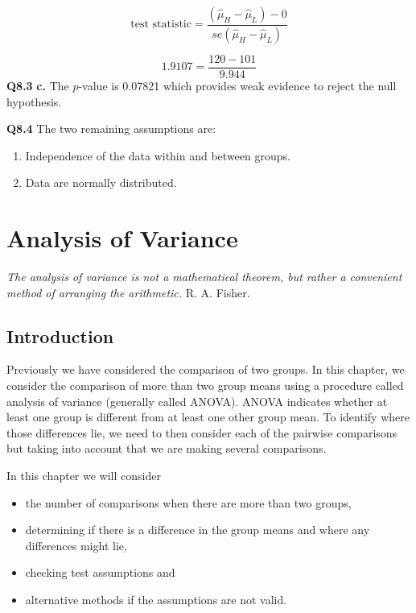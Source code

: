 \documentclass[
  oneside]{krantz}
\providecommand{\tightlist}{%
  \setlength{\itemsep}{0pt}\setlength{\parskip}{0pt}}
\begin{document}
\[\textrm{test statistic} = \frac{(\hat \mu_H - \hat \mu_L) - 0}{se(\hat \mu_H - \hat \mu_L)}\]

\[ 1.9107 =\frac{120 - 101}{9.944} \]
\textbf{Q8.3} \textbf{c.} The \(p\)-value is 0.07821 which provides weak evidence to reject the null hypothesis.

\textbf{Q8.4} The two remaining assumptions are:

\begin{enumerate}
\def\labelenumi{\arabic{enumi}.}
\item
  Independence of the data within and between groups.
\item
  Data are normally distributed.
\end{enumerate}

\hypertarget{anova}{%
\chapter{Analysis of Variance}\label{anova}}

{ \emph{The analysis of variance is not a mathematical theorem, but rather a convenient method of arranging the arithmetic.} R. A. Fisher. }

\hypertarget{INTanova}{%
\section{Introduction}\label{INTanova}}

Previously we have considered the comparison of two groups. In this chapter, we consider the comparison of more than two group means using a procedure called analysis of variance (generally called ANOVA). ANOVA indicates whether at least one group is different from at least one other group mean. To identify where those differences lie, we need to then consider each of the pairwise comparisons but taking into account that we are making several comparisons.

In this chapter we will consider

\begin{itemize}
\tightlist
\item
  the number of comparisons when there are more than two groups,
\item
  determining if there is a difference in the group means and where any differences might lie,
\item
  checking test assumptions and
\item
  alternative methods if the assumptions are not valid.
\end{itemize}
\end{document}
